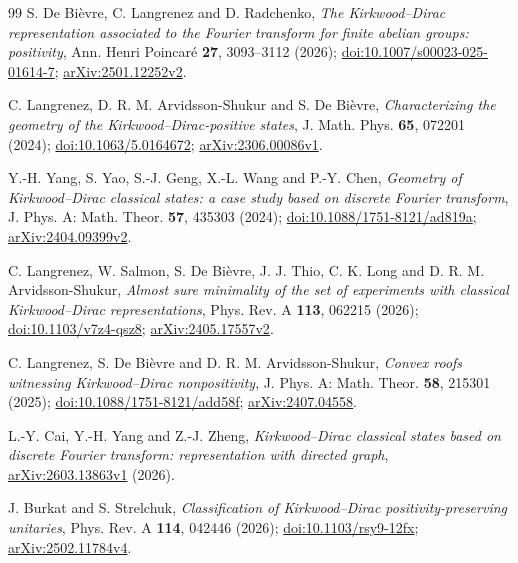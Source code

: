 \documentclass[11pt,a4paper]{article}
\theoremstyle{definition}
\theoremstyle{plain}
\begin{document}
\begingroup\small
\begin{thebibliography}{99}
\setlength{\itemsep}{2pt}
S. De Bi\`evre, C. Langrenez and D. Radchenko,
\emph{The Kirkwood--Dirac representation associated to the Fourier transform
for finite abelian groups: positivity},
Ann. Henri Poincar\'e \textbf{27}, 3093--3112 (2026);
\href{https://doi.org/10.1007/s00023-025-01614-7}{doi:10.1007/s00023-025-01614-7};
\href{https://arxiv.org/abs/2501.12252v2}{arXiv:2501.12252v2}.

C. Langrenez, D. R. M. Arvidsson-Shukur and S. De Bi\`evre,
\emph{Characterizing the geometry of the Kirkwood--Dirac-positive states},
J. Math. Phys. \textbf{65}, 072201 (2024);
\href{https://doi.org/10.1063/5.0164672}{doi:10.1063/5.0164672};
\href{https://arxiv.org/abs/2306.00086v1}{arXiv:2306.00086v1}.

Y.-H. Yang, S. Yao, S.-J. Geng, X.-L. Wang and P.-Y. Chen,
\emph{Geometry of Kirkwood--Dirac classical states: a case study based on
discrete Fourier transform},
J. Phys. A: Math. Theor. \textbf{57}, 435303 (2024);
\href{https://doi.org/10.1088/1751-8121/ad819a}{doi:10.1088/1751-8121/ad819a};
\href{https://arxiv.org/abs/2404.09399v2}{arXiv:2404.09399v2}.

C. Langrenez, W. Salmon, S. De Bi\`evre, J. J. Thio, C. K. Long and
D. R. M. Arvidsson-Shukur,
\emph{Almost sure minimality of the set of experiments with classical
Kirkwood--Dirac representations},
Phys. Rev. A \textbf{113}, 062215 (2026);
\href{https://doi.org/10.1103/v7z4-qsz8}{doi:10.1103/v7z4-qsz8};
\href{https://arxiv.org/abs/2405.17557v2}{arXiv:2405.17557v2}.

C. Langrenez, S. De Bi\`evre and D. R. M. Arvidsson-Shukur,
\emph{Convex roofs witnessing Kirkwood--Dirac nonpositivity},
J. Phys. A: Math. Theor. \textbf{58}, 215301 (2025);
\href{https://doi.org/10.1088/1751-8121/add58f}{doi:10.1088/1751-8121/add58f};
\href{https://arxiv.org/abs/2407.04558}{arXiv:2407.04558}.

L.-Y. Cai, Y.-H. Yang and Z.-J. Zheng,
\emph{Kirkwood--Dirac classical states based on discrete Fourier transform:
representation with directed graph},
\href{https://arxiv.org/abs/2603.13863v1}{arXiv:2603.13863v1} (2026).

J. Burkat and S. Strelchuk,
\emph{Classification of Kirkwood--Dirac positivity-preserving unitaries},
Phys. Rev. A \textbf{114}, 042446 (2026);
\href{https://doi.org/10.1103/rsy9-12fx}{doi:10.1103/rsy9-12fx};
\href{https://arxiv.org/abs/2502.11784v4}{arXiv:2502.11784v4}.


\end{thebibliography}
\end{document}
